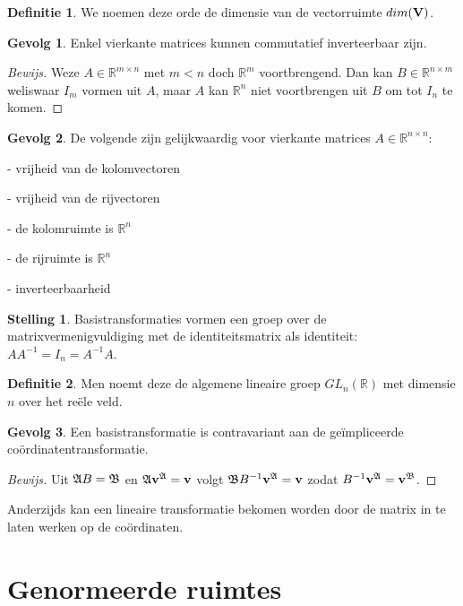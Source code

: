 \documentclass{amsart}
\theoremstyle{definition}
\newtheorem{thm}{Stelling}[section]
\newtheorem{dfn}{Definitie}[section]
\newtheorem{csq}{Gevolg}[section]
\newenvironment{bewijs}{\begin{proof}[Bewijs]}{\end{proof}}
\newcommand{\realnums}{\mathbb{R}}
\newcommand{\realn}[1][n]{\realnums^{#1}}
\newcommand{\realmx}[2][n]{\realn[#2 \times #1]}
\newcommand{\realnxn}{\realmx{n}}
\newcommand{\realmxn}{\realmx{m}}
\newcommand{\vecspace}[1][v]{\mathrm{\mathbf{\MakeUppercase#1}}}
\newcommand{\vvec}[1][v]{\mathbf{#1}}
\newcommand{\vecrow}[1][a]{\mathfrak{\MakeUppercase{#1}}}
\newcommand{\cvec}[2]{{#1}^{#2}}
\newcommand{\cvecv}[2][v]{\cvec{\vvec[#1]}{#2}}
\newcommand{\cvecva}[1][a]{\cvecv{\vecrow[#1]}}
\begin{document}
\begin{dfn}
    We noemen deze orde de dimensie van de vectorruimte $dim(\vecspace)$.
\end{dfn}

\begin{csq}
    Enkel vierkante matrices kunnen commutatief inverteerbaar zijn.
    \begin{bewijs}
        Weze $A \in \realmxn$ met $m < n$ doch $\realn[m]$ voortbrengend.
        Dan kan $B \in \realmx[m]{n}$ weliswaar $I_m$ vormen uit $A$, maar $A$ kan $\realn$ niet voortbrengen uit $B$ om tot $I_n$ te komen.
    \end{bewijs}
\end{csq}

\begin{csq}
    De volgende zijn gelijkwaardig voor vierkante matrices $A \in \realnxn$:

    - vrijheid van de kolomvectoren

    - vrijheid van de rijvectoren

    - de kolomruimte is $\realn$

    - de rijruimte is $\realn$

    - inverteerbaarheid
\end{csq}

\begin{thm}
    Basistransformaties vormen een groep over de matrixvermenigvuldiging met de identiteitsmatrix als identiteit: $AA^{-1} = I_n = A^{-1}A$.
\end{thm}

\begin{dfn}
    Men noemt deze de algemene lineaire groep $GL_n(\realnums)$ met dimensie $n$ over het reële veld.
\end{dfn}

\begin{csq}
    Een basistransformatie is contravariant aan de ge\"{i}mpliceerde co\"{o}rdinatentransformatie.
    \begin{bewijs}
        Uit $\vecrow B = \vecrow[b]$ en $\vecrow \cvecva= \vvec$ volgt $\vecrow[b] B^{-1} \cvecva = \vvec$ zodat $B^{-1} \cvecva = \cvecva[b]$.
    \end{bewijs}
\end{csq}

Anderzijds kan een lineaire transformatie bekomen worden door de matrix in te laten werken op de coördinaten.

\section{Genormeerde ruimtes}
\end{document}
